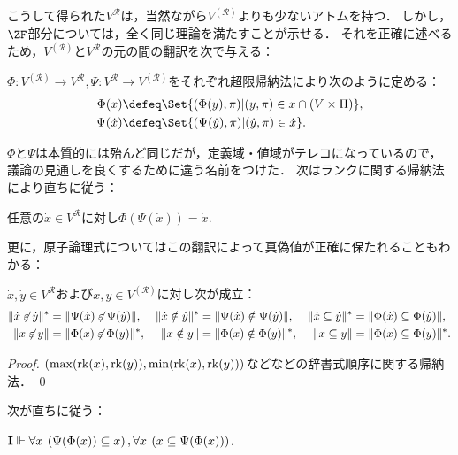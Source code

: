 \documentclass[realisability.tex]{subfiles}
\begin{document}
こうして得られた$V^{\mathcal{R}}$は，当然ながら$V^{(\mathcal{R})}$よりも少ないアトムを持つ．
しかし，$\ZF$部分については，全く同じ理論を満たすことが示せる．
それを正確に述べるため，$V^{(\mathcal{R})}$と$V^{\mathcal{R}}$の元の間の翻訳を次で与える：
\begin{definition}
 $\Phi: V^{(\mathcal{R})} \to V^{\mathcal{R}}, \Psi: V^{\mathcal{R}} \to V^{(\mathcal{R})}$をそれぞれ超限帰納法により次のように定める：
 \begin{align*}
  \Phi(x) &\defeq \Set{ (\Phi(y), \pi) | (y, \pi) \in x \cap (V \times \Pi)},\\
  \Psi(\dot{x}) &\defeq \Set{ (\Psi(\dot{y}), \pi) | (\dot{y}, \pi) \in \dot{x}}.
 \end{align*}
\end{definition}
$\Phi$と$\Psi$は本質的には殆んど同じだが，定義域・値域がテレコになっているので，議論の見通しを良くするために違う名前をつけた．
次はランクに関する帰納法により直ちに従う：
\begin{lemma}\label{lem:phi-of-psi}
 任意の$\dot{x} \in V^{\mathcal{R}}$に対し$\Phi(\Psi(\dot{x})) = \dot{x}$.
\end{lemma}
更に，原子論理式についてはこの翻訳によって真偽値が正確に保たれることもわかる：
\begin{lemma}\label{lem:atomic-coinc}
 $\dot{x}, \dot{y} \in V^{\mathcal{R}}$および$x, y \in V^{(\mathcal{R})}$に対し次が成立：
 \begin{align*}
  \|\dot{x} \not\mathrel{\varepsilon} \dot{y}\|^*   &= \|\Psi(\dot{x}) \not\mathrel{\varepsilon} \Psi(\dot{y})\|, &
  \|\dot{x} \notin \dot{y}\|^*    &= \|\Psi(\dot{x}) \notin \Psi(\dot{y})\|, &
  \|\dot{x} \subseteq \dot{y}\|^* &= \|\Phi(\dot{x}) \subseteq \Phi(\dot{y})\|, \\
  \|x \not\mathrel{\varepsilon} y\|   &= \|\Phi(x) \not\mathrel{\varepsilon} \Phi(y)\|^*, &
  \|x \notin y\|    &= \|\Phi(x) \notin \Phi(y)\|^*, &
  \|x \subseteq y\| &= \|\Phi(x) \subseteq \Phi(y)\|^*.
 \end{align*}
\end{lemma}
\begin{proof}
 $(\max(\operatorname{rk}(x), \operatorname{rk}(y)), \min(\operatorname{rk}(x), \operatorname{rk}(y)))$などなどの辞書式順序に関する帰納法． \qed
\end{proof}
次が直ちに従う：
\begin{corollary}
 $\mathsf{\mathbf{I}} \Vdash \forall x \: \left(\Psi(\Phi(x)) \subseteq x\right),
  \forall x \: \left(x \subseteq \Psi(\Phi(x)) \right)$.
\end{corollary}
\end{document}
